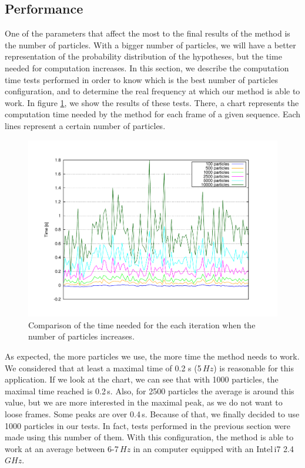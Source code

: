 \subsection{Performance}\label{ch:chapter05_02_04}

One of the parameters that affect the most to the final results of the method is the number of particles. With a bigger number of particles, we will have a better representation of the probability distribution of the hypotheses, but the time needed for computation increases. In this section, we describe the computation time tests performed in order to know which is the best number of particles configuration, and to determine the real frequency at which our method is able to work.
In figure \ref{fig:cp05_time_vs_particles}, we show the results of these tests. There, a chart represents the computation time needed by the method for each frame of a given sequence. Each lines represent a certain number of particles.

\begin{figure}[t]
  \centering
  \includegraphics[width=\textwidth,height=0.5\textwidth,trim=50 50 90 60, clip]{timesVsParticles}
  \caption{Comparison of the time needed for the each iteration when the number of particles increases.}\label{fig:cp05_time_vs_particles}
\end{figure}

As expected, the more particles we use, the more time the method needs to work. We considered that at least a maximal time of 0.2 s (5\,$Hz$) is reasonable for this application. If we look at the chart, we can see that with 1000 particles, the maximal time reached is 0.2\,s. Also, for 2500 particles the average is around this value, but we are more interested in the maximal peak, as we do not want to loose frames. Some peaks are over 0.4\,s. Because of that, we finally decided to use 1000 particles in our tests. In fact, tests performed in the previous section were made using this number of them. With this configuration, the method is able to work at an average between 6-7\,$Hz$ in an computer equipped with an Intel\textregistered\,i7 2.4\,$GHz$.

